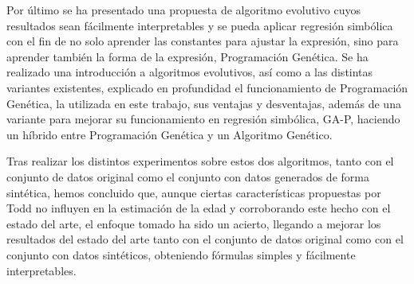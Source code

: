 Por último se ha presentado una propuesta de algoritmo evolutivo cuyos resultados sean fácilmente interpretables y se pueda aplicar regresión simbólica con el fin de no solo aprender las constantes para ajustar la expresión, sino para aprender también la forma de la expresión, Programación Genética. Se ha realizado una introducción a algoritmos evolutivos, así como a las distintas variantes existentes, explicado en profundidad el funcionamiento de Programación Genética, la utilizada en este trabajo, sus ventajas y desventajas, además de una variante para mejorar su funcionamiento en regresión simbólica, GA-P, haciendo un híbrido entre Programación Genética y un Algoritmo Genético.

Tras realizar los distintos experimentos sobre estos dos algoritmos, tanto con el conjunto de datos original como el conjunto con datos generados de forma sintética, hemos concluido que, aunque ciertas características propuestas por Todd no influyen en la estimación de la edad y corroborando este hecho con el estado del arte, el enfoque tomado ha sido un acierto, llegando a mejorar los resultados del estado del arte tanto con el conjunto de datos original como con el conjunto con datos sintéticos, obteniendo fórmulas simples y fácilmente interpretables.
